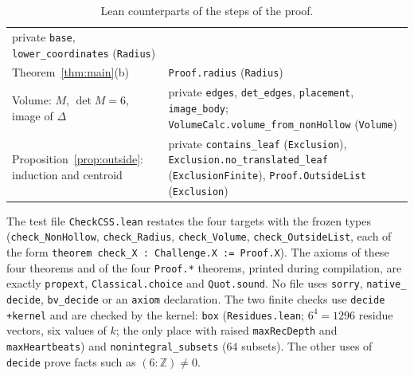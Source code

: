 \documentclass[11pt]{article}
\theoremstyle{definition}
\theoremstyle{remark}
\newcommand{\Z}{\mathbb Z}
\begin{document}
{\begin{table}[ht]
\begin{tabular}{@{}>{\raggedright\arraybackslash}p{}>{\raggedright\arraybackslash}p{}@{}}
private \texttt{base}, \texttt{lower\_coordinates} (\texttt{Radius}) \\
Theorem~\ref{thm:main}(b) & \texttt{Proof.radius} (\texttt{Radius}) \\
Volume: $M$, $\det M=6$, image of $\Delta$ &
private \texttt{edges}, \texttt{det\_edges}, \texttt{placement},
\texttt{image\_body}; \texttt{VolumeCalc.volume\_from\_nonHollow}
(\texttt{Volume}) \\
Proposition~\ref{prop:outside}: induction and centroid &
private \texttt{contains\_leaf} (\texttt{Exclusion}),
\texttt{Exclusion.no\_translated\_leaf} (\texttt{ExclusionFinite}),
\texttt{Proof.OutsideList} (\texttt{Exclusion}) \\
\hline
\end{tabular}
\caption{Lean counterparts of the steps of the proof.}
\label{tab:lean}
\end{table}

\noindent The test file \texttt{CheckCSS.lean} restates the four targets with
the frozen types (\texttt{check\_\allowbreak NonHollow},
\texttt{check\_\allowbreak Radius}, \texttt{check\_\allowbreak Volume},
\texttt{check\_\allowbreak OutsideList}, each of the form
\texttt{theorem check\_X : Challenge.X := Proof.X}). The axioms of these four
theorems and of the four \texttt{Proof.*} theorems, printed during
compilation, are exactly \texttt{propext}, \texttt{Classical.choice} and
\texttt{Quot.sound}. No file uses \texttt{sorry}, \texttt{native\_\allowbreak
decide}, \texttt{bv\_\allowbreak decide} or an \texttt{axiom} declaration.
The two finite checks use \texttt{decide +kernel} and are checked by the
kernel: \texttt{box} (\texttt{Residues.lean}; $6^4=1296$ residue vectors, six values of
$k$; the only place with raised \texttt{maxRecDepth} and
\texttt{maxHeartbeats}) and \texttt{nonintegral\_\allowbreak subsets}
($64$ subsets). The other uses of \texttt{decide} prove facts such as
$(6:\Z)\ne0$.

}
\end{document}
